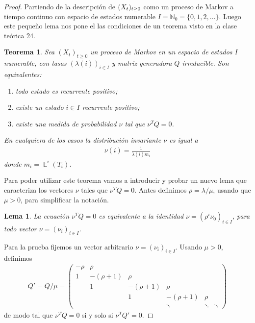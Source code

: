 \documentclass{article}
\DeclareMathOperator{\Expectation}{\mathbb{E}}
\newcommand{\naturalnum}{\mathbb{N}}
\newtheorem{theorem}{Teorema}
\newtheorem{lemma}{Lema}
\theoremstyle{definition}
\begin{document}
\begin{proof}
Partiendo de la descripción de \((X_t)_{t \geq 0}\) como un proceso de Markov a tiempo continuo con espacio de estados numerable \(I =  \naturalnum_0 = \{0, 1, 2, \dots\}\).
Luego este pequeño lema nos pone el las condiciones de un teorema visto en la clase teórica 24.

\begin{theorem}
\label{theorem:PositiveRecurrentMarkovProcesses}
Sea \((X_t)_{t \geq 0}\) un proceso de Markov en un espacio de estados \(I\) numerable, con tasas \((\lambda(i))_{i \in I}\) y matriz generadora \(Q\) irreducible.
Son equivalentes:
\begin{enumerate}
	\item todo estado es recurrente positivo;
	\item existe un estado \(i \in I\) recurrente positivo;
	\item existe una medida de probabilidad \(\nu\) tal que \(\nu^{T} Q = 0\).
\end{enumerate}
En cualquiera de los casos la distribución invariante \(\nu\) es igual a
\begin{align}
	\nu(i) = \frac{1}{\lambda(i) m_i}
\end{align}
donde \(m_i = \Expectation^i(T_i)\).
\end{theorem}

Para poder utilizar este teorema vamos a introducir y probar un nuevo lema que caracteriza los vectores \(\nu\) tales que \(\nu^T Q = 0\).
Antes definimos \(\rho = \lambda / \mu\), usando que \(\mu > 0\), para simplificar la notación.
\begin{lemma}
\label{lemma:LeftNullspaceOfGeneratorMatrix}
La ecuación \(\nu^T Q = 0\) es equivalente a la identidad \(\nu = (\rho^i \nu_0)_{i \in I}\), para todo vector \(\nu = (\nu_i)_{i \in I}\).
\end{lemma}
Para la prueba fijemos un vector arbitrario \(\nu = (\nu_i)_{i \in I}\).
Usando \(\mu > 0\), definimos
\begin{align}
	Q'
	=
	Q / \mu
	=
	\begin{pmatrix}
		- \rho &\rho \\
		1 &- (\rho + 1) &\rho \\
		 &1 &- (\rho + 1) &\rho \\
		 & &1 &- (\rho + 1) &\rho \\
		 & & &\ddots &\ddots &\ddots
	\end{pmatrix}
\end{align}
de modo tal que \(\nu^T Q = 0\) si y solo si \(\nu^T Q' = 0\).


\end{proof}
\end{document}
